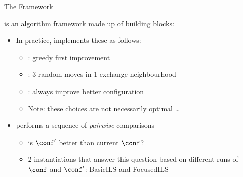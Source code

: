 \begin{frame}[c,fragile]{The \paramils{} Framework}

\paramils{} is an algorithm framework made up of building blocks:

\begin{itemize}
  \item In practice, \paramils{} implements these as follows:
  \begin{itemize}
    \item {}: greedy first improvement
    \item {}: 3 random moves in 1-exchange neighbourhood
    \item {}: always improve better configuration
    \item Note: these choices are not necessarily optimal \ldots
  \end{itemize}
  
  \pause
  \bigskip
  
  \item \paramils{} performs a sequence of \emph{pairwise} comparisons
  \begin{itemize}
    \item \alert{is $\conf'$ better than current $\conf$}?
    \item 2 instantiations that answer this question based on different runs of $\conf$ and $\conf'$: \alert{BasicILS} and \alert{FocusedILS}
  \end{itemize}   
\end{itemize}


\end{frame}



